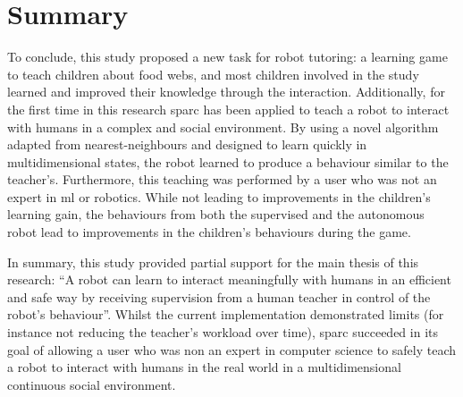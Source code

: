 

\section{Summary}

To conclude, this study proposed a new task for robot tutoring: a learning game to teach children about food webs, and most children involved in the study learned and improved their knowledge through the interaction. Additionally, for the first time in this research \gls{sparc} has been applied to teach a robot to interact with humans in a complex and social environment. By using a novel algorithm adapted from nearest-neighbours and designed to learn quickly in multidimensional states, the robot learned to produce a behaviour similar to the teacher's. Furthermore, this teaching was performed by a user who was not an expert in \gls{ml} or robotics. While not leading to improvements in the children's learning gain, the behaviours from both the supervised and the autonomous robot lead to improvements in the children's behaviours during the game. 

In summary, this study provided partial support for the main thesis of this research: ``A robot can learn to interact meaningfully with humans in an efficient and safe way by receiving supervision from a human teacher in control of the robot's behaviour''. Whilst the current implementation demonstrated limits (for instance not reducing the teacher's workload over time), \gls{sparc} succeeded in its goal of allowing a user who was non an expert in computer science to safely teach a robot to interact with humans in the real world in a multidimensional continuous social environment. 